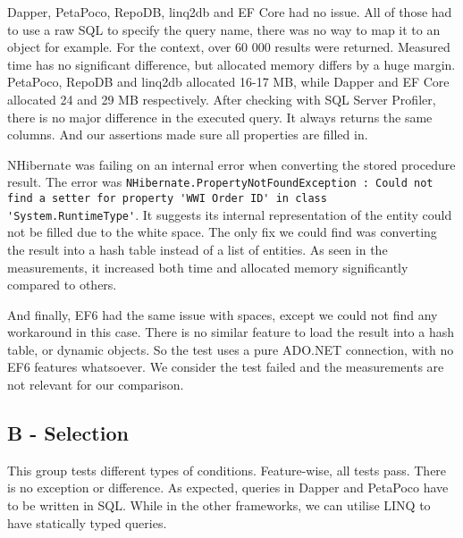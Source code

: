 Dapper, PetaPoco, RepoDB, linq2db and EF Core had no issue. All of those had to use a raw SQL to specify the query name, there was no way to map it to an object for example. For the context, over 60 000 results were returned. Measured time has no significant difference, but allocated memory differs by a huge margin. PetaPoco, RepoDB and linq2db allocated 16-17 MB, while Dapper and EF Core allocated 24 and 29 MB respectively. After checking with SQL Server Profiler, there is no major difference in the executed query. It always returns the same columns. And our assertions made sure all properties are filled in.

NHibernate was failing on an internal error when converting the stored procedure result.
The error was \lstinline{NHibernate.PropertyNotFoundException : Could not find a setter for property 'WWI Order ID' in class 'System.RuntimeType'}.
It suggests its internal representation of the entity could not be filled due to the white space. The only fix we could find was converting the result into a hash table instead of a list of entities. As seen in the measurements, it increased both time and allocated memory significantly compared to others.

And finally, EF6 had the same issue with spaces, except we could not find any workaround in this case. There is no similar feature to load the result into a hash table, or dynamic objects. So the test uses a pure ADO.NET connection, with no EF6 features whatsoever. We consider the test failed and the measurements are not relevant for our comparison.

\subsection{B - Selection}
This group tests different types of conditions. Feature-wise, all tests pass. There is no exception or difference. As expected, queries in Dapper and PetaPoco have to be written in SQL. While in the other frameworks, we can utilise LINQ to have statically typed queries. 



